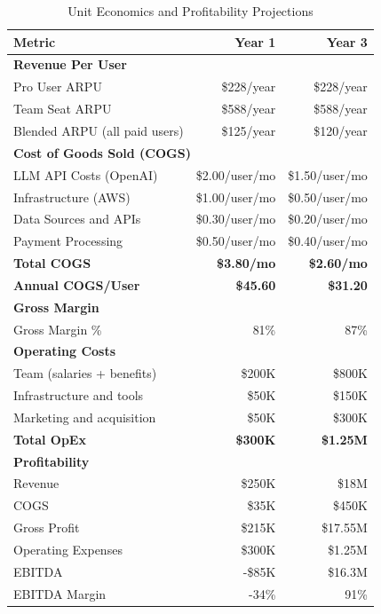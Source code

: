 \documentclass{report}
\begin{document}
\begin{table}[h]
\centering
\begin{tabular}{|l|r|r|}
\toprule
\textbf{Metric} & \textbf{Year 1} & \textbf{Year 3} \\
\midrule
\multicolumn{3}{|l|}{\textbf{Revenue Per User}} \\
Pro User ARPU & \$228/year & \$228/year \\
Team Seat ARPU & \$588/year & \$588/year \\
Blended ARPU (all paid users) & \$125/year & \$120/year \\
\midrule
\multicolumn{3}{|l|}{\textbf{Cost of Goods Sold (COGS)}} \\
LLM API Costs (OpenAI) & \$2.00/user/mo & \$1.50/user/mo \\
Infrastructure (AWS) & \$1.00/user/mo & \$0.50/user/mo \\
Data Sources and APIs & \$0.30/user/mo & \$0.20/user/mo \\
Payment Processing & \$0.50/user/mo & \$0.40/user/mo \\
\midrule
\textbf{Total COGS} & \textbf{\$3.80/mo} & \textbf{\$2.60/mo} \\
\textbf{Annual COGS/User} & \textbf{\$45.60} & \textbf{\$31.20} \\
\midrule
\multicolumn{3}{|l|}{\textbf{Gross Margin}} \\
Gross Margin \% & 81\% & 87\% \\
\midrule
\multicolumn{3}{|l|}{\textbf{Operating Costs}} \\
Team (salaries + benefits) & \$200K & \$800K \\
Infrastructure and tools & \$50K & \$150K \\
Marketing and acquisition & \$50K & \$300K \\
\midrule
\textbf{Total OpEx} & \textbf{\$300K} & \textbf{\$1.25M} \\
\midrule
\multicolumn{3}{|l|}{\textbf{Profitability}} \\
Revenue & \$250K & \$18M \\
COGS & \$35K & \$450K \\
Gross Profit & \$215K & \$17.55M \\
Operating Expenses & \$300K & \$1.25M \\
EBITDA & -\$85K & \$16.3M \\
EBITDA Margin & -34\% & 91\% \\
\bottomrule
\end{tabular}
\caption{Unit Economics and Profitability Projections}
\end{table}
\end{document}
